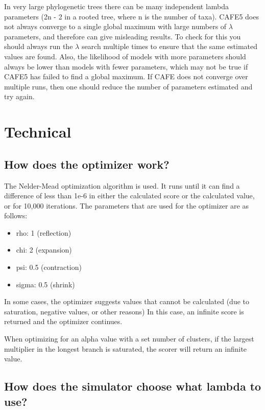 \documentclass{article}
\newcommand{\shortname}{CAFE5 }
\begin{document}
In very large phylogenetic trees there can be many independent lambda parameters (2n - 2 in a rooted tree, where n is the number of taxa). \shortname does not always converge to a single global maximum with large numbers of $\lambda$ parameters, and therefore can give misleading results. To check for this you should always run the $\lambda$ search multiple times to ensure that the same estimated values are found. Also, the likelihood of models with more parameters should always be lower than models with fewer parameters, which may not be true if \shortname has failed to find a global maximum. If CAFE does not converge over multiple runs, then one should reduce the number of parameters estimated and try again.

\section{Technical}

\subsection{How does the optimizer work?}

The Nelder-Mead optimization algorithm is used. It runs until it can find a difference of less than 1e-6 in either the calculated score or the calculated value, or for 10,000 iterations. The parameters that are used for the optimizer are as follows:

\begin{itemize}
  \item rho: 1 (reflection)
  \item chi: 2 (expansion)
  \item psi: 0.5 (contraction)
  \item sigma: 0.5 (shrink)
\end{itemize}

In some cases, the optimizer suggests values that cannot be calculated (due to saturation, negative values, or other reasons) In this case, an infinite score is returned and the optimizer continues.

When optimizing for an alpha value with a set number of clusters, if the largest multiplier in the longest branch is saturated, the scorer will return an infinite value.

\subsection{How does the simulator choose what lambda to use?}
\end{document}
